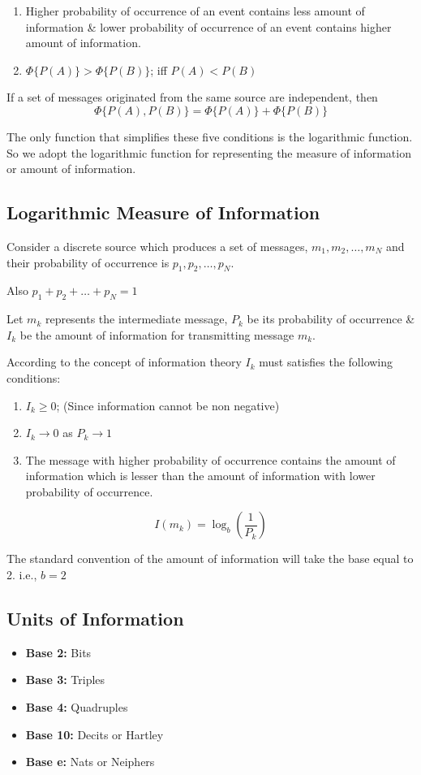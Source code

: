 \documentclass[12pt]{article}
\begin{document}

\begin{enumerate}
	\item[iv.] Higher probability of occurrence of an event contains less amount of information \& lower probability of occurrence of an event contains higher amount of information.
	\item[v.] $\Phi\{P(A)\} > \Phi\{P(B)\}$; iff $P(A) < P(B)$
\end{enumerate}

If a set of messages originated from the same source are independent, then
$$\Phi\{P(A),P(B)\} = \Phi\{P(A)\} + \Phi\{P(B)\}$$

The only function that simplifies these five conditions is the logarithmic function. So we adopt the logarithmic function for representing the measure of information or amount of information.

\subsection{Logarithmic Measure of Information}
Consider a discrete source which produces a set of messages, $m_1, m_2, \ldots, m_N$ and their probability of occurrence is $p_1, p_2, \ldots, p_N$.

Also $p_1 + p_2 + \ldots + p_N = 1$

Let $m_k$ represents the intermediate message, $P_k$ be its probability of occurrence \& $I_k$ be the amount of information for transmitting message $m_k$.

According to the concept of information theory $I_k$ must satisfies the following conditions:
\begin{enumerate}
	\item $I_k \ge 0$; (Since information cannot be non negative)
	\item $I_k \longrightarrow 0$ as $P_k \longrightarrow 1$
	\item The message with higher probability of occurrence contains the amount of information which is lesser than the amount of information with lower probability of occurrence.
\end{enumerate}

$$I(m_k) = \log_b \left( \frac{1}{P_k} \right)$$

The standard convention of the amount of information will take the base equal to 2. i.e., $b=2$


\subsection{Units of Information}
\begin{itemize}
	\item \textbf{Base 2:} Bits
	\item \textbf{Base 3:} Triples
	\item \textbf{Base 4:} Quadruples
	\item \textbf{Base 10:} Decits or Hartley
	\item \textbf{Base e:} Nats or Neiphers
\end{itemize}
\end{document}
